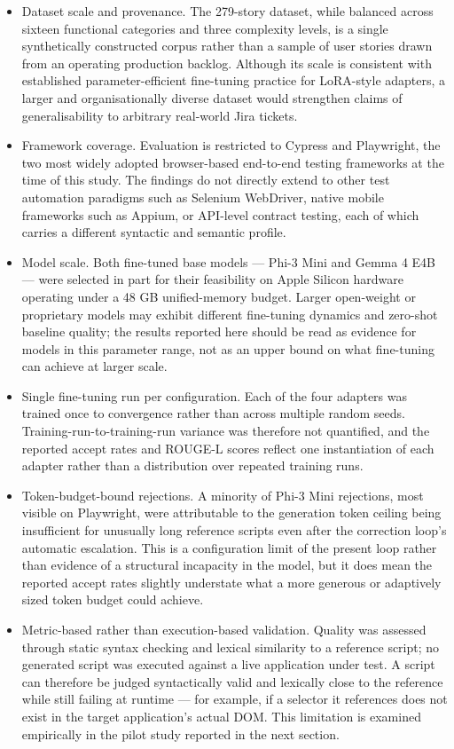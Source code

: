 \begin{itemize}
\item
  Dataset scale and provenance. The 279-story dataset, while balanced
  across sixteen functional categories and three complexity levels, is a
  single synthetically constructed corpus rather than a sample of user
  stories drawn from an operating production backlog. Although its scale
  is consistent with established parameter-efficient fine-tuning
  practice for LoRA-style adapters, a larger and organisationally
  diverse dataset would strengthen claims of generalisability to
  arbitrary real-world Jira tickets.
\item
  Framework coverage. Evaluation is restricted to Cypress and
  Playwright, the two most widely adopted browser-based end-to-end
  testing frameworks at the time of this study. The findings do not
  directly extend to other test automation paradigms such as Selenium
  WebDriver, native mobile frameworks such as Appium, or API-level
  contract testing, each of which carries a different syntactic and
  semantic profile.
\item
  Model scale. Both fine-tuned base models --- Phi-3 Mini and Gemma 4
  E4B --- were selected in part for their feasibility on Apple Silicon
  hardware operating under a 48 GB unified-memory budget. Larger
  open-weight or proprietary models may exhibit different fine-tuning
  dynamics and zero-shot baseline quality; the results reported here
  should be read as evidence for models in this parameter range, not as
  an upper bound on what fine-tuning can achieve at larger scale.
\item
  Single fine-tuning run per configuration. Each of the four adapters
  was trained once to convergence rather than across multiple random
  seeds. Training-run-to-training-run variance was therefore not
  quantified, and the reported accept rates and ROUGE-L scores reflect
  one instantiation of each adapter rather than a distribution over
  repeated training runs.
\item
  Token-budget-bound rejections. A minority of Phi-3 Mini rejections,
  most visible on Playwright, were attributable to the generation token
  ceiling being insufficient for unusually long reference scripts even
  after the correction loop's automatic escalation. This is a
  configuration limit of the present loop rather than evidence of a
  structural incapacity in the model, but it does mean the reported
  accept rates slightly understate what a more generous or adaptively
  sized token budget could achieve.
\item
  Metric-based rather than execution-based validation. Quality was
  assessed through static syntax checking and lexical similarity to a
  reference script; no generated script was executed against a live
  application under test. A script can therefore be judged syntactically
  valid and lexically close to the reference while still failing at
  runtime --- for example, if a selector it references does not exist in
  the target application's actual DOM. This limitation is examined
  empirically in the pilot study reported in the next section.
\end{itemize}

